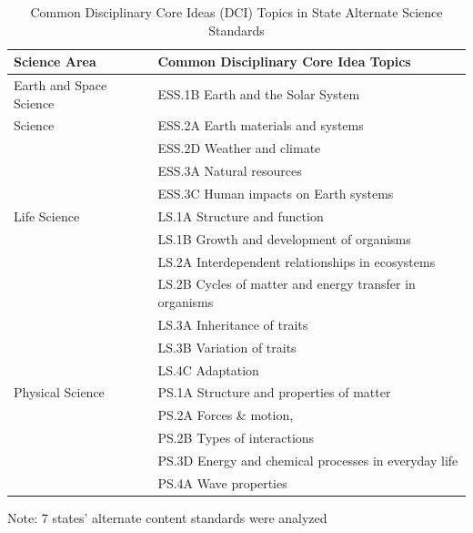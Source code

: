 \documentclass[11.5pt]{sig-alternate} %
\begin{document}
\begin{large}
\begin{table}[th]
\caption{Common Disciplinary Core Ideas (DCI) Topics in State Alternate Science Standards}
\begin{tabular}{ll}
\hline
Science Area & Common Disciplinary Core Idea Topics \\ \hline
Earth and Space Science	& ESS.1B Earth and the Solar System \\
Science & ESS.2A Earth materials and systems \\
& ESS.2D Weather and climate \\
& ESS.3A Natural resources \\
& ESS.3C Human impacts on Earth systems \\
Life Science & LS.1A Structure and function  \\
& LS.1B Growth and development of organisms \\
& LS.2A Interdependent relationships in ecosystems \\
& LS.2B Cycles of matter and energy transfer in organisms  \\
& LS.3A Inheritance of traits \\
& LS.3B Variation of traits \\
& LS.4C Adaptation \\
Physical Science & PS.1A Structure and properties of matter  \\
& PS.2A Forces \& motion,  \\
& PS.2B Types of interactions  \\
& PS.3D Energy and chemical processes in everyday life \\
& PS.4A Wave properties \\ \hline
\end{tabular}
Note: 7 states’ alternate content standards were analyzed
\end{table}


\end{large}
\end{document}
